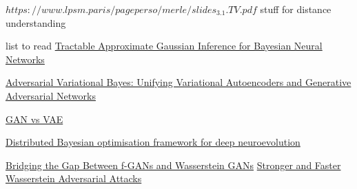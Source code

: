 \documentclass[honours,12pt]{unswthesis}
\numberwithin{equation}{section}
\begin{document}
\noindent $https://www.lpsm.paris/pageperso/merle/slides_3.1.TV.pdf$ stuff for distance understanding

list to read
\href{https://jmlr.org/papers/volume22/20-1009/20-1009.pdf}{Tractable Approximate Gaussian Inference for
Bayesian Neural Networks
}

\href{https://arxiv.org/pdf/1701.04722.pdf}{Adversarial Variational Bayes:
Unifying Variational Autoencoders and Generative Adversarial Networks}

\href{https://towardsdatascience.com/gans-vs-autoencoders-comparison-of-deep-generative-models-985cf15936ea}{GAN vs VAE}

\href{https://pdf.sciencedirectassets.com/271597/1-s2.0-S0925231221X00409/1-s2.0-S0925231221015319/main.pdf?X-Amz-Security-Token=IQoJb3JpZ2luX2VjEAsaCXVzLWVhc3QtMSJGMEQCIFyD6EVhq7gdc13HAw8Qa2abqSEg7RfyW64DmMVAwR%2FAAiAx%2FqYNhfvEXwgQS08r%2FMhhr5VEr%2Be%2BKQ7Nbt9dBYn1iir6AwgjEAQaDDA1OTAwMzU0Njg2NSIMzSUp5Xe14ZtAoyoUKtcD5V8UPCBeS1sryr6y2PzuwXdsx%2FBvmdgsnfgRx1Acrgomb7ZC%2BVpRecYAvucvzsgbXwr4%2FY23IWXOjQVvqaIcF9d6%2F3VF5lJjfBtqyUDoUAZ6fMfSVsgKbMRkbIK%2BUaZot4%2BXfz7LLN3HZla8oHd2sTktGlGF8x4e9UR2PONy%2FZt%2B8Le6H%2FpmTQOEChAS5I23%2Bw0g%2BbW%2B%2FMIOpbdP4tGzrxVpJX4swn1N5QW4SIVF1abKsksuJPt%2FAGLYy%2BzlTEGZ55ycsE0DO3HIQHzRcQcO0MCYd0GcP8sNOmRCk3Jay5KLK%2FPdw0xHow7982Mra1vNMPHgcNPESFshdfg3ukTsqBWWi6AsbEiYJwJDbO1CHpZ4WGllcAvKc91KyLqQE6XUSLzJUCykxTtb1rvjq9ypjki44bdW2ROmKJ%2BymoRnGspYm8U%2FweObZTTKA5LygERVcMPMXLutBWzdSJxvE2DoRgTx5gUpkEpOblBl4QYSwGRFfy1RwxilaNC82XhmeEPUUySfONoSD%2BdRZJk4gtNUjrBJKTtXe7PK8UrnhLybytQ%2BBZTZEl7iU5yb1Zc5jtiGinqiB3FNJ%2BMadk3%2B5ZtfRK2E%2BI5ETcjD6uUYt44KY4kx93sSt%2BAMMNXO844GOqYBLuihn5E46ZnGuLqmP2PzNJSAQ%2F%2Fx6X4SDKC8iS2%2FUaj7e5GPNb69qrcYy%2BnYMmk1XyXxk%2FBmpBj7oKIaS3Xu1GvczXn1i1keem794sv93urWnxC7hYa5Rlx9S2cLqOM9mcNsq1xy6R7lKu2T2of2NvbRYDIjIN1BVAHkr0BWiGSL5L4bFyeJwVgfajomw31LAznCz5G7Arbl3L8EssueNZ2DjR7LVw%3D%3D&X-Amz-Algorithm=AWS4-HMAC-SHA256&X-Amz-Date=20220111T025152Z&X-Amz-SignedHeaders=host&X-Amz-Expires=300&X-Amz-Credential=ASIAQ3PHCVTYWCQOVEXF%2F20220111%2Fus-east-1%2Fs3%2Faws4_request&X-Amz-Signature=63ecad95ada9138a0f14d0c02a0a2f2b564d4ca6a5d6e7e02d06e8a7667310c1&hash=e5ac045fcf223511dbac539722bc02c21c35d61165b6e09cd3e194252b56c49e&host=68042c943591013ac2b2430a89b270f6af2c76d8dfd086a07176afe7c76c2c61&pii=S0925231221015319&tid=spdf-4e567811-c9bc-4491-a143-d0a95da3d0eb&sid=d01637fd29bfb242294978015ea29ea8700bgxrqa&type=client#page=1&zoom=100,0,0}{Distributed Bayesian optimisation framework for deep neuroevolution}


\href{https://icml.cc/virtual/2020/poster/6640}{Bridging the Gap Between f-GANs and Wasserstein GANs}
\href{https://icml.cc/virtual/2020/poster/5871}{Stronger and Faster Wasserstein Adversarial Attacks}
\end{document}
